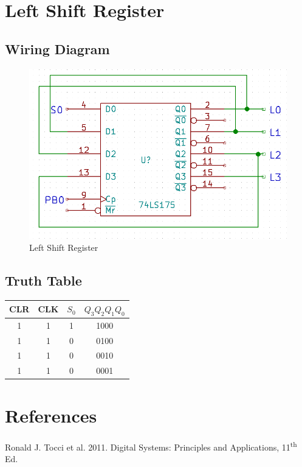 \documentclass[11pt,a4paper]{article}
\begin{document}
\section{Left Shift Register}
\subsection{Wiring Diagram}
\begin{figure}[H]
    \centering
    \includegraphics[width=5in]{right_shift.png}
    \caption{Left Shift Register}
\end{figure}
\subsection{Truth Table}
\begin{tabular}{| c | c | c | c |}
    \hline CLR & CLK & $S_0$ & $Q_3Q_2Q_1Q_0$ \\
    \hline 1 & 1 & 1 & 1000 \\
    \hline 1 & 1 & 0 & 0100 \\
    \hline 1 & 1 & 0 & 0010 \\
    \hline 1 & 1 & 0 & 0001 \\
    \hline
\end{tabular}
\section{References}
Ronald J. Tocci et al. 2011. Digital Systems: Principles and Applications, 11\textsuperscript{th} Ed.
\end{document}
